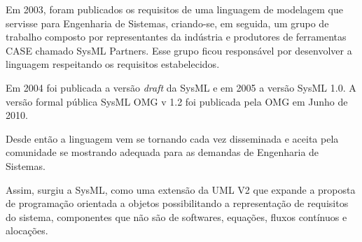 Em 2003, foram publicados os requisitos de uma linguagem de modelagem que servisse para Engenharia de Sistemas, criando-se, em seguida, um grupo de trabalho composto por representantes da indústria e produtores de ferramentas CASE chamado SysML Partners. Esse grupo ficou responsável por desenvolver a linguagem respeitando os requisitos estabelecidos. 

Em 2004 foi publicada a versão \textit{draft} da SysML e em 2005 a versão SysML 1.0. A versão formal pública SysML OMG v 1.2 foi publicada pela  OMG em Junho de 2010. 

Desde então a linguagem vem se tornando cada vez disseminada e aceita pela comunidade se mostrando adequada para as demandas de Engenharia de Sistemas.

Assim, surgiu a SysML, como uma extensão da UML V2 que expande a proposta de programação orientada a objetos possibilitando a representação de requisitos do sistema, componentes que não são de softwares, equações, fluxos contínuos e alocações.





